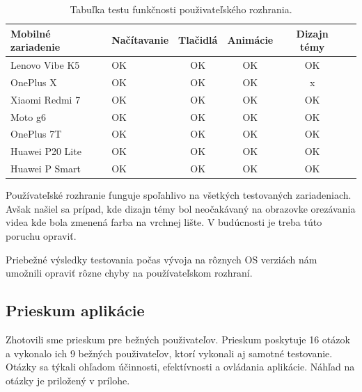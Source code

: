 \documentclass[12pt, oneside]{book}
\begin{document}
\begin{table}[H]

\begin{center}
\begin{tabularx}{\textwidth}{
| >{\centering\arraybackslash}X
| >{\centering\arraybackslash}X
| >{\centering\arraybackslash}c
| >{\centering\arraybackslash}c
| >{\centering\arraybackslash}c
| >{\centering\arraybackslash}c|} 
  \hline
 \textbf{Mobilné zariadenie}  & \textbf{Načítavanie} & \textbf{Tlačidlá} & \textbf{Animácie} & \textbf{Dizajn témy} \\
 \hline
Lenovo Vibe K5 & OK & OK & OK & OK \\
 \hline
  OnePlus X & OK & OK & OK & x \\
 \hline
 Xiaomi Redmi 7 & OK & OK & OK & OK \\
 \hline
 Moto g6 &  OK & OK & OK & OK \\
 \hline
OnePlus 7T &  OK & OK & OK & OK \\
 \hline
 Huawei P20 Lite &  OK & OK & OK & OK \\
 \hline
 Huawei P Smart &  OK & OK & OK & OK  \\
 \hline

\end{tabularx}

\caption{Tabuľka testu funkčnosti použivateľského rozhrania. }
\end{center}
\end{table}

Používateľské rozhranie funguje spoľahlivo na všetkých testovaných zariadeniach. Avšak našiel sa prípad, kde dizajn témy bol neočakávaný na obrazovke orezávania videa kde bola zmenená farba na vrchnej lište. V budúcnosti je treba túto poruchu opraviť. 

Priebežné výsledky testovania počas vývoja na rôznych OS verziách nám umožnili opraviť rôzne chyby na používateľskom rozhraní.

\subsection{Prieskum aplikácie}

\hspace{15pt} Zhotovili sme prieskum pre bežných použivateľov. Prieskum poskytuje 16 otázok a vykonalo ich 9 bežných použivateľov, ktorí vykonali aj samotné testovanie. Otázky sa týkali ohľadom účinnosti, efektívnosti a ovládania aplikácie. Náhľad na otázky je priložený v prílohe.


\end{document}
